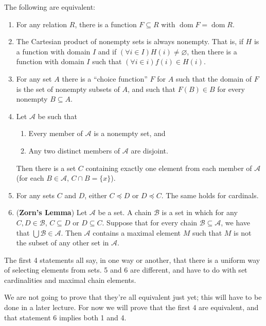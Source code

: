 \begin{theorem}
    The following are equivalent: 

    \begin{enumerate}
        \item For any relation $R$, there is a function $F \subseteq R$ with $\operatorname{dom}F = \operatorname{dom}R$.
        \item The Cartesian product of nonempty sets is always nonempty. That is, if $H$ is a function with domain $I$ and if $(\forall i \in I)H(i) \neq \varnothing$, then there is a function with domain $I$ such that $(\forall i \in i)f(i) \in H(i)$. 
        \item For any set $A$ there is a ``choice function'' $F$ for $A$ such that the domain of $F$ is the set of nonempty subsets of $A$, and such that $F(B) \in B$ for every nonempty $B \subseteq A$. 
        \item Let $\mathcal{A}$ be such that 
        \begin{enumerate}[label=(\alph*)]
            \item Every member of $\mathcal{A}$ is a nonempty set, and 
            \item Any two distinct members of $\mathcal{A}$ are disjoint.
        \end{enumerate}
        Then there is a set $C$ containing exactly one element from each member of $\mathcal{A}$ (for each $B \in \mathcal{A}$, $C \cap B = \{x\}$).
        \item For any sets $C$ and $D$, either $C \preceq D$ or $D \preceq C$. The same holds for cardinals. 
        \item (\textbf{Zorn's Lemma}) Let $\mathcal{A}$ be a set. A chain $\mathcal{B}$ is a set in which for any $C,D \in \mathcal{B}$, $C \subseteq D$ or $D \subseteq C$. Suppose that for every chain $\mathcal{B} \subseteq \mathcal{A}$, we have that $\bigcup \mathcal{B} \in \mathcal{A}$. Then $\mathcal{A}$ contains a maximal element $M$ such that $M$ is not the subset of any other set in $\mathcal{A}$. 
    \end{enumerate}
\end{theorem}

The first 4 statements all say, in one way or another, that there is a uniform way of selecting elements from sets. 5 and 6 are different, and have to do with set cardinalities and maximal chain elements. 

We are not going to prove that they're all equivalent just yet; this will have to be done in a later lecture. For now we will prove that the first 4 are equivalent, and that statement 6 implies both 1 and 4. 

